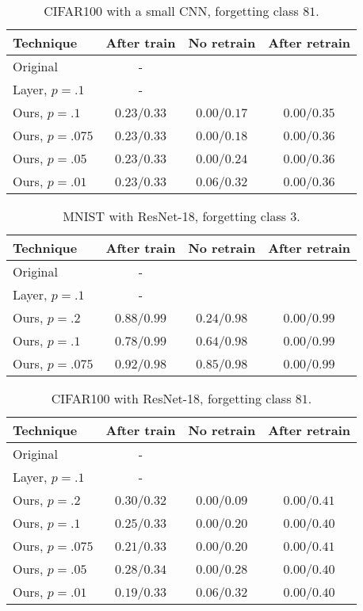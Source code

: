 \documentclass{article}
\begin{document}
\begin{table}
    \centering
    \caption{CIFAR100 with a small CNN, forgetting class $81$.}
    \label{tab:cifar_small_cnn}
    \begin{tabular}{l | c | c c}
        Technique&After train&No retrain&After retrain\\
        \hline
        Original&-\\
        Layer, $p=.1$&-\\
        \hline
        Ours, $p=.1$&$0.23$/$0.33$&$0.00$/$0.17$&$0.00$/$0.35$\\
        Ours, $p=.075$&$0.23$/$0.33$&$0.00$/$0.18$&$0.00$/$0.36$\\
        Ours, $p=.05$&$0.23$/$0.33$&$0.00$/$0.24$&$0.00$/$0.36$\\
        Ours, $p=.01$&$0.23$/$0.33$&$0.06$/$0.32$&$0.00$/$0.36$\\
    \end{tabular}
\end{table}

\begin{table}
    \centering
    \caption{MNIST with ResNet-18, forgetting class $3$.}
    \label{tab:mnist_resnet}
    \begin{tabular}{l | c | c c}
        Technique&After train&No retrain&After retrain\\
        \hline
        Original&-\\
        Layer, $p=.1$&-\\
        \hline
        Ours, $p=.2$&$0.88$/$0.99$&$0.24$/$0.98$&$0.00$/$0.99$\\
        Ours, $p=.1$&$0.78$/$0.99$&$0.64$/$0.98$&$0.00$/$0.99$\\
        Ours, $p=.075$&$0.92$/$0.98$&$0.85$/$0.98$&$0.00$/$0.99$\\
    \end{tabular}
\end{table}

\begin{table}
    \centering
    \caption{CIFAR100 with ResNet-18, forgetting class $81$.}
    \label{tab:cifar_resnet}
    \begin{tabular}{l | c | c c}
        Technique&After train&No retrain&After retrain\\
        \hline
        Original&-\\
        Layer, $p=.1$&-\\
        \hline
        Ours, $p=.2$&$0.30$/$0.32$&$0.00$/$0.09$&$0.00$/$0.41$\\
        Ours, $p=.1$&$0.25$/$0.33$&$0.00$/$0.20$&$0.00$/$0.40$\\
        Ours, $p=.075$&$0.21$/$0.33$&$0.00$/$0.20$&$0.00$/$0.41$\\
        Ours, $p=.05$&$0.28$/$0.34$&$0.00$/$0.28$&$0.00$/$0.40$\\
        Ours, $p=.01$&$0.19$/$0.33$&$0.06$/$0.32$&$0.00$/$0.40$\\
    \end{tabular}
\end{table}
\end{document}
